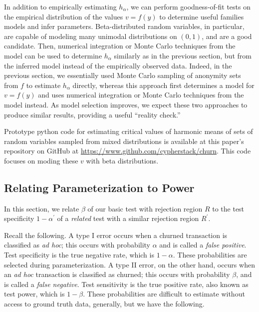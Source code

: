 \documentclass{tran-l}
\theoremstyle{cor}
\theoremstyle{definition}
\theoremstyle{remark}
\theoremstyle{conjecture}
\numberwithin{equation}{section}
\begin{document}
In addition to empirically estimating $h_\alpha$, we can perform goodness-of-fit tests on the empirical distribution of the values $v = f(y)$ to determine useful families models and infer parameters.
Beta-distributed random variables, in particular, are capable of modeling many unimodal distributions on $(0,1)$, and are a good candidate.
Then, numerical integration or Monte Carlo techniques from the model can be used to determine $h_{\alpha}$ similarly as in the previous section, but from the inferred model instead of the empirically observed data.
Indeed, in the previous section, we essentially used Monte Carlo sampling of anonymity sets from $f$ to estimate $h_\alpha$ directly, whereas this approach first determines a model for $v = f(y)$ and uses numerical integration or Monte Carlo techniques from the model instead.
As model selection improves, we expect these two approaches to produce similar results, providing a useful ``reality check.''

Prototype python code for estimating critical values of harmonic means of sets of random variables sampled from mixed distributions is available at this paper's repository on GitHub at \url{https://www.github.com/cypherstack/churn}.
This code focuses on moding these $v$ with beta distributions.




\subsection{Relating Parameterization to Power}\label{sec:basic_parameterization_and_power}


In this section, we relate $\beta$ of our basic test with rejection region $R$ to the test specificity $1-\alpha^\prime$ of a \textit{related} test with a similar rejection region $R^\prime$.

Recall the following.
A type I error occurs when a churned transaction is classified as \textit{ad hoc}; this occurs with probability $\alpha$ and is called a \textit{false positive}.
Test specificity is the true negative rate, which is $1-\alpha$.
These probabilities are selected during parameterization.
A type II error, on the other hand, occurs when an \textit{ad hoc} transaction is classified as churned; this occurs with probability $\beta$, and is called a \textit{false negative}.
Test sensitivity is the true positive rate, also known as test power, which is $1-\beta$.
These probabilities are difficult to estimate without access to ground truth data, generally, but we have the following.
\end{document}
